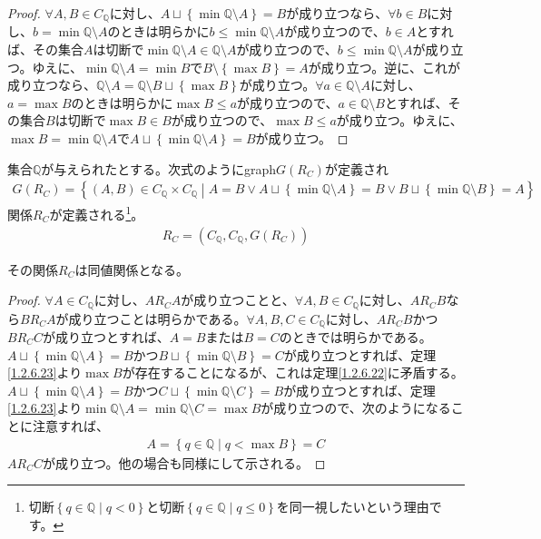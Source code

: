 \documentclass[dvipdfmx]{jsarticle}
\begin{document}
\begin{proof}
$\forall A,B \in C_{\mathbb{Q}}$に対し、$A \sqcup \left\{ \min{\mathbb{Q} \setminus A} \right\} = B$が成り立つなら、$\forall b \in B$に対し、$b = \min{\mathbb{Q} \setminus A}$のときは明らかに$b \leq \min{\mathbb{Q} \setminus A}$が成り立つので、$b \in A$とすれば、その集合$A$は切断で$\min{\mathbb{Q} \setminus A} \in \mathbb{Q} \setminus A$が成り立つので、$b \leq \min{\mathbb{Q} \setminus A}$が成り立つ。ゆえに、$\min{\mathbb{Q} \setminus A} = \min B$で$B \setminus \left\{ \max B \right\} = A$が成り立つ。逆に、これが成り立つなら、$\mathbb{Q} \setminus A = \mathbb{Q} \setminus B \sqcup \left\{ \max B \right\}$が成り立つ。$\forall a \in \mathbb{Q} \setminus A$に対し、$a = \max B$のときは明らかに$\max B \leq a$が成り立つので、$a \in \mathbb{Q} \setminus B$とすれば、その集合$B$は切断で$\max B \in B$が成り立つので、$\max B \leq a$が成り立つ。ゆえに、$\max B = \min{\mathbb{Q} \setminus A}$で$A \sqcup \left\{ \min{\mathbb{Q} \setminus A} \right\} = B$が成り立つ。
\end{proof}
\begin{dfn}
集合$\mathbb{Q}$が与えられたとする。次式のようにgraph$G\left( R_{C} \right)$が定義され
\begin{align*}
G\left( R_{C} \right) = \left\{ (A,B) \in C_{\mathbb{Q}} \times C_{\mathbb{Q}} \middle| A = B \vee A \sqcup \left\{ \min{\mathbb{Q} \setminus A} \right\} = B \vee B \sqcup \left\{ \min{\mathbb{Q} \setminus B} \right\} = A \right\}
\end{align*}
関係$R_{C}$が定義される\footnote{切断$\left\{ q \in \mathbb{Q} \middle| q < 0 \right\}$と切断$\left\{ q \in \mathbb{Q} \middle| q \leq 0 \right\}$を同一視したいという理由です。}。
\begin{align*}
R_{C} = \left( C_{\mathbb{Q}},C_{\mathbb{Q}},G\left( R_{C} \right) \right)
\end{align*}
\end{dfn}
\begin{thm}\label{1.2.6.24}
その関係$R_{C}$は同値関係となる。
\end{thm}
\begin{proof}
$\forall A \in C_{\mathbb{Q}}$に対し、$AR_{C}A$が成り立つことと、$\forall A,B \in C_{\mathbb{Q}}$に対し、$AR_{C}B$なら$BR_{C}A$が成り立つことは明らかである。$\forall A,B,C \in C_{\mathbb{Q}}$に対し、$AR_{C}B$かつ$BR_{C}C$が成り立つとすれば、$A = B$または$B = C$のときでは明らかである。$A \sqcup \left\{ \min{\mathbb{Q} \setminus A} \right\} = B$かつ$B \sqcup \left\{ \min{\mathbb{Q} \setminus B} \right\} = C$が成り立つとすれば、定理\ref{1.2.6.23}より$\max B$が存在することになるが、これは定理\ref{1.2.6.22}に矛盾する。$A \sqcup \left\{ \min{\mathbb{Q} \setminus A} \right\} = B$かつ$C \sqcup \left\{ \min{\mathbb{Q} \setminus C} \right\} = B$が成り立つとすれば、定理\ref{1.2.6.23}より$\min{\mathbb{Q} \setminus A} = \min{\mathbb{Q} \setminus C} = \max B$が成り立つので、次のようになることに注意すれば、
\begin{align*}
A = \left\{ q \in \mathbb{Q} \middle| q < \max B \right\} = C
\end{align*}
$AR_{C}C$が成り立つ。他の場合も同様にして示される。
\end{proof}
\end{document}
